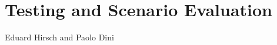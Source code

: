 \chapter{Testing and Scenario Evaluation}
\label{ch:testing}

\vspace{-1cm}
\begin{center}
Eduard Hirsch and Paolo Dini
\end{center}

